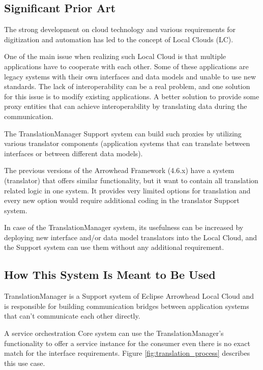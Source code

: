 \documentclass[a4paper]{arrowhead}
\begin{document}
\subsection{Significant Prior Art}
\label{sec:prior_art}

The strong development on cloud technology and various requirements for digitization and automation has led to the concept of Local Clouds (LC).

One of the main issue when realizing such Local Cloud is that multiple applications have to cooperate with each other. Some of these applications are legacy systems with their own interfaces and data models and unable to use new standards. The lack of interoperability can be a real problem, and one solution for this issue is to modify existing applications. A better solution to provide some proxy entities that can achieve interoperability by translating data during the communication.

The TranslationManager Support system can build such proxies by utilizing various translator components (application systems that can translate between interfaces or between different data models).

The previous versions of the Arrowhead Framework (4.6.x) have a system (translator) that offers similar functionality, but it want to contain all translation related logic in one system. It provides very limited options for translation and every new option would require additional coding in the translator Support system.

In case of the TranslationManager system, its usefulness can be increased by deploying new interface and/or data model translators into the Local Cloud, and the Support system can use them without any additional requirement.

\subsection{How This System Is Meant to Be Used}
\label{sec:use}

TranslationManager is a Support system of Eclipse Arrowhead Local Cloud and is responsible for building communication bridges between application systems that can't communicate each other directly. 

A service orchestration Core system can use the TranslationManager's functionality to offer a service instance for the consumer even there is no exact match for the interface requirements. Figure \ref{fig:translation_process} describes this use case.
\end{document}
